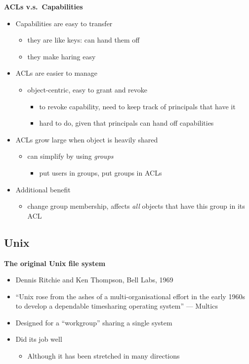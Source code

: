 \documentclass[11pt,a4paper]{article}
\begin{document}
\textbf{ACLs v.s.\ Capabilities}
\begin{itemize}
    \item Capabilities are easy to transfer
        \begin{itemize}
            \item they are like keys: can hand them off
            \item they make haring easy
        \end{itemize}
    \item ACLs are easier to manage
        \begin{itemize}
            \item object-centric, easy to grant and revoke
                \begin{itemize}
                    \item to revoke capability, need to keep track of principals that have it
                    \item hard to do, given that principals can hand off capabilities
                \end{itemize}
        \end{itemize}
    \item ACLs grow large when object is heavily shared
        \begin{itemize}
            \item can simplify by using \emph{groups}
                \begin{itemize}
                    \item put users in groups, put groups in ACLs
                \end{itemize}
        \end{itemize}
    \item Additional benefit
        \begin{itemize}
            \item change group membership, affects \emph{all} objects that have this group in
                its ACL
        \end{itemize}
\end{itemize}

\subsection{Unix}

\textbf{The original Unix file system}
\begin{itemize}
    \item Dennis Ritchie and Ken Thompson, Bell Labs, 1969
    \item ``Unix rose from the ashes of a multi-organisational effort in the early 1960s to
        develop a dependable timesharing operating system'' --- Multics
    \item Designed for a ``workgroup'' sharing a single system
    \item Did its job well
        \begin{itemize}
            \item Although it has been stretched in many directions
        \end{itemize}
\end{itemize}
\end{document}
